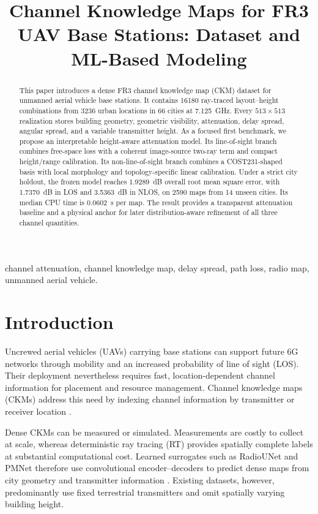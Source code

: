 \documentclass[10pt,conference,letterpaper]{IEEEtran}
\title{Channel Knowledge Maps for FR3 UAV Base Stations: Dataset and ML-Based Modeling}
\author{\IEEEauthorblockN{Guillem Moreno Garcia, Sergi Abadal, Evgenii Vinogradov}
\IEEEauthorblockA{Universitat Polit\`ecnica de Catalunya (UPC), Barcelona, Spain\\
guillem.moreno.garcia@estudiantat.upc.edu}}
\begin{document}
\maketitle

\begin{abstract}
This paper introduces a dense FR3 channel knowledge map (CKM) dataset for
unmanned aerial vehicle base stations. It contains 16180 ray-traced
layout--height combinations from 3236 urban locations in 66 cities at
\SI{7.125}{GHz}. Every $513\times513$ realization stores building geometry,
geometric visibility, attenuation, delay spread, angular spread, and a
variable transmitter height. As a focused first benchmark, we propose an
interpretable height-aware attenuation model. Its line-of-sight branch combines
free-space loss with a coherent image-source two-ray term and compact
height/range calibration. Its non-line-of-sight branch combines a
COST231-shaped basis with local morphology and topology-specific linear
calibration. Under a strict city holdout, the frozen model reaches
\SI{1.9289}{dB} overall root mean square error, with \SI{1.7370}{dB} in LOS and
\SI{3.5363}{dB} in NLOS, on 2590 maps from 14 unseen cities. Its median CPU
time is \SI{0.0602}{s} per map. The result provides a transparent attenuation
baseline and a physical anchor for later distribution-aware refinement of all
three channel quantities.
\end{abstract}

\begin{IEEEkeywords}
channel attenuation, channel knowledge map, delay spread, path loss, radio map,
unmanned aerial vehicle.
\end{IEEEkeywords}

\section{Introduction}
Uncrewed aerial vehicles (UAVs) carrying base stations can support future 6G
networks through mobility and an increased probability of line of sight (LOS).
Their deployment nevertheless requires
fast, location-dependent channel information for placement and resource
management. Channel knowledge maps (CKMs) address this need by indexing
channel information by transmitter or receiver location
\cite{ckmtutorial2024,zengx2021ckm}.

Dense CKMs can be measured or simulated. Measurements are costly to collect at
scale, whereas deterministic ray tracing (RT) provides spatially complete
labels at substantial computational cost. Learned surrogates such as
RadioUNet and PMNet therefore use convolutional encoder--decoders to predict
dense maps from city geometry and transmitter information
\cite{radiounet2020,pmnet2023}. Existing datasets, however,
predominantly use fixed terrestrial transmitters and omit spatially varying
building height.
\end{document}
